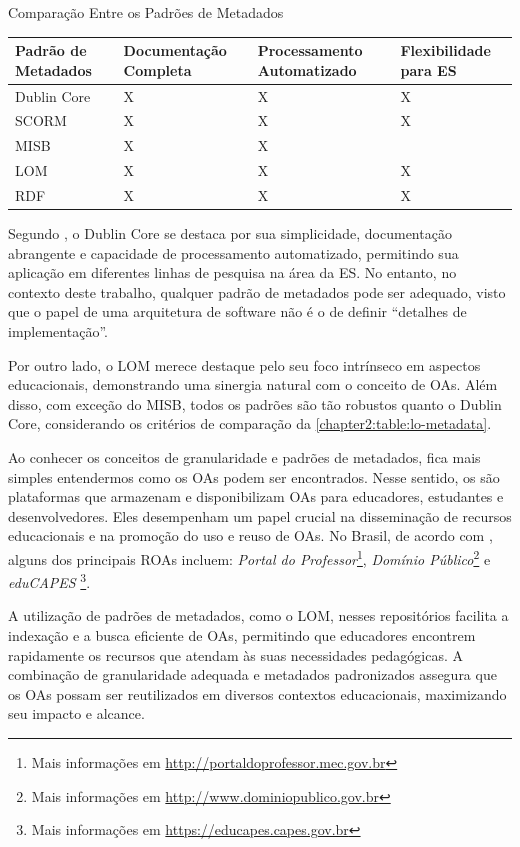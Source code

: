 \begin{quadro}[htb]
\caption{Comparação Entre os Padrões de Metadados} 
\label{chapter2:table:lo-metadata}
\begin{tabular}{P{3.5cm}|P{3cm}|P{3cm}|P{3cm}}\hline
\textbf{Padrão de Metadados} & \textbf{Documentação Completa} & \textbf{Processamento Automatizado} & \textbf{Flexibilidade para ES} \\ \hline
Dublin Core & X & X & X \\  \hline
SCORM & X & X & X \\ \hline
MISB & X & X & \\ \hline
LOM & X & X & X \\ \hline
RDF & X & X & X \\ \hline
\end{tabular}
\end{quadro}

Segundo , o Dublin Core se destaca por sua simplicidade, documentação abrangente e capacidade de processamento automatizado, permitindo sua aplicação em diferentes linhas de pesquisa na área da ES. No entanto, no contexto deste trabalho, qualquer padrão de metadados pode ser adequado, visto que o papel de uma arquitetura de software não é o de definir ``detalhes de implementação''. 

Por outro lado, o LOM merece destaque pelo seu foco intrínseco em aspectos educacionais, demonstrando uma sinergia natural com o conceito de OAs. Além disso, com exceção do MISB, todos os padrões são tão robustos quanto o Dublin Core, considerando os critérios de comparação da \autoref{chapter2:table:lo-metadata}.

Ao conhecer os conceitos de granularidade e padrões de metadados, fica mais simples entendermos como os OAs podem ser encontrados. Nesse sentido, os  são plataformas que armazenam e disponibilizam OAs para educadores, estudantes e desenvolvedores. Eles desempenham um papel crucial na disseminação de recursos educacionais e na promoção do uso e reuso de OAs. No Brasil, de acordo com , alguns dos principais ROAs incluem: \textit{Portal do Professor}\footnote{Mais informações em \url{http://portaldoprofessor.mec.gov.br}}, \textit{Domínio Público}\footnote{Mais informações em \url{http://www.dominiopublico.gov.br}} e \textit{eduCAPES} \footnote{Mais informações em \url{https://educapes.capes.gov.br}}.

A utilização de padrões de metadados, como o LOM, nesses repositórios facilita a indexação e a busca eficiente de OAs, permitindo que educadores encontrem rapidamente os recursos que atendam às suas necessidades pedagógicas. A combinação de granularidade adequada e metadados padronizados assegura que os OAs possam ser reutilizados em diversos contextos educacionais, maximizando seu impacto e alcance.

